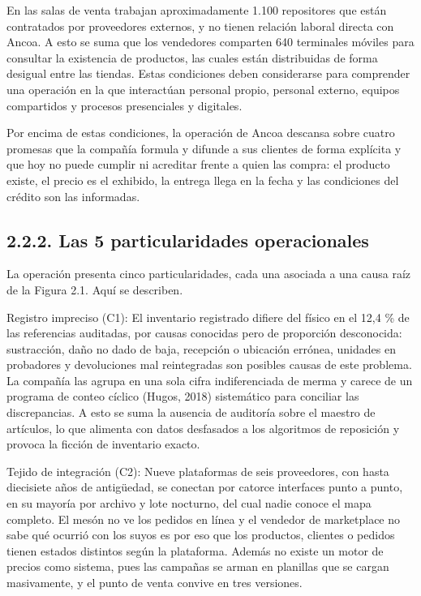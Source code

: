 \documentclass[11pt]{article}
\begin{document}
En las salas de venta trabajan aproximadamente 1.100 repositores que están contratados por proveedores externos, y no tienen relación laboral directa con Ancoa. A esto se suma que los vendedores comparten 640 terminales móviles para consultar la existencia de productos, las cuales están distribuidas de forma desigual entre las tiendas. Estas condiciones deben considerarse para comprender una operación en la que interactúan personal propio, personal externo, equipos compartidos y procesos presenciales y digitales.

Por encima de estas condiciones, la operación de Ancoa descansa sobre cuatro promesas que la compañía formula y difunde a sus clientes de forma explícita y que hoy no puede cumplir ni acreditar frente a quien las compra: el producto existe, el precio es el exhibido, la entrega llega en la fecha y las condiciones del crédito son las informadas.

\subsection{2.2.2. Las 5 particularidades operacionales}\label{las-5-particularidades-operacionales}

La operación presenta cinco particularidades, cada una asociada a una causa raíz de la Figura 2.1. Aquí se describen.

Registro impreciso (C1): El inventario registrado difiere del físico en el 12,4 \% de las referencias auditadas, por causas conocidas pero de proporción desconocida: sustracción, daño no dado de baja, recepción o ubicación errónea, unidades en probadores y devoluciones mal reintegradas son posibles causas de este problema. La compañía las agrupa en una sola cifra indiferenciada de merma y carece de un programa de conteo cíclico (Hugos, 2018) sistemático para conciliar las discrepancias. A esto se suma la ausencia de auditoría sobre el maestro de artículos, lo que alimenta con datos desfasados a los algoritmos de reposición y provoca la ficción de inventario exacto.

Tejido de integración (C2): Nueve plataformas de seis proveedores, con hasta diecisiete años de antigüedad, se conectan por catorce interfaces punto a punto, en su mayoría por archivo y lote nocturno, del cual nadie conoce el mapa completo. El mesón no ve los pedidos en línea y el vendedor de marketplace no sabe qué ocurrió con los suyos es por eso que los productos, clientes o pedidos tienen estados distintos según la plataforma. Además no existe un motor de precios como sistema, pues las campañas se arman en planillas que se cargan masivamente, y el punto de venta convive en tres versiones.
\end{document}
